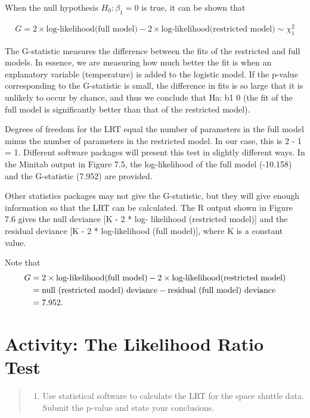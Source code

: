 \documentclass[
]{report}
\providecommand{\tightlist}{%
  \setlength{\itemsep}{0pt}\setlength{\parskip}{0pt}}
\begin{document}
When the null hypothesis \(H_0: \beta_1 = 0\) is true, it can be shown that

\begin{align}
G = 2 \times \text{log-likelihood(full model)} - 2 \times \text{log-likelihood(restricted model)} \sim \chi^2_1 
\tag{7.15}
\end{align}

The G-statistic measures the difference between the fits of the restricted and full models. In essence, we
are measuring how much better the fit is when an explanatory variable (temperature) is added to the logistic
model. If the p-value corresponding to the G-statistic is small, the difference in fits is so large that it is unlikely
to occur by chance, and thus we conclude that Ha: b1 0 (the fit of the full model is significantly better than
that of the restricted model).

Degrees of freedom for the LRT equal the number of parameters in the full model minus the number of
parameters in the restricted model. In our case, this is 2 - 1 = 1. Different software packages will present
this test in slightly different ways. In the Minitab output in Figure 7.5, the log-likelihood of the full model
(-10.158) and the G-statistic (7.952) are provided.

Other statistics packages may not give the G-statistic, but they will give enough information so that
the LRT can be calculated. The R output shown in Figure 7.6 gives the null deviance {[}K - 2 * log-
likelihood (restricted model){]} and the residual deviance {[}K - 2 * log-likelihood (full model){]}, where
K is a constant value.

Note that
\begin{align}
G &= 2 \times \text{log-likelihood(full model)} - 2 \times \text{log-likelihood(restricted model)} \notag \\
&= \text{null (restricted model) deviance} - \text{residual (full model) deviance} \notag \\
&= 7.952. \notag 
\end{align}

\section*{Activity: The Likelihood Ratio Test}\label{activity-the-likelihood-ratio-test}

\begin{quote}
\begin{enumerate}
\def\labelenumi{\arabic{enumi}.}
\setcounter{enumi}{13}
\tightlist
\item
  Use statistical software to calculate the LRT for the space shuttle data. Submit the p-value and state your conclusions.
\end{enumerate}
\end{quote}
\end{document}

